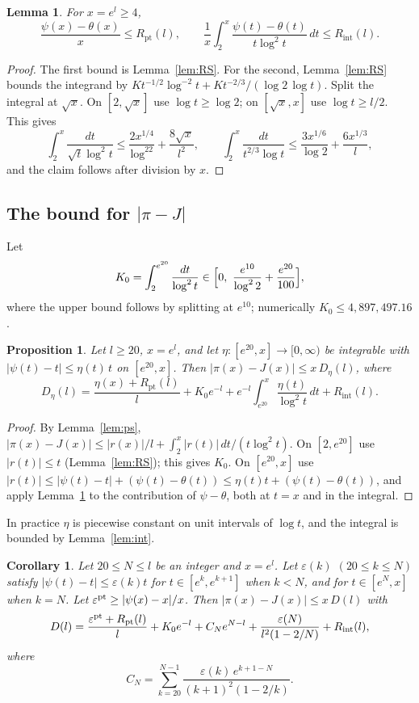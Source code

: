 \documentclass{amsart}
\newtheorem{lemma}[theorem]{Lemma}
\newtheorem{proposition}[theorem]{Proposition}
\newtheorem{corollary}[theorem]{Corollary}
\theoremstyle{definition}
\theoremstyle{remark}
\theoremstyle{plain}
\numberwithin{equation}{section}
\newcommand{\eps}{\varepsilon}
\newcommand{\Rpt}{R_{\mathrm{pt}}}
\newcommand{\Rint}{R_{\mathrm{int}}}
\begin{document}
\begin{lemma}\label{lem:psitheta}
For $x=e^l\ge4$,
\[
\frac{\psi(x)-\theta(x)}{x}\le\Rpt(l),\qquad
\frac1x\int_2^x\frac{\psi(t)-\theta(t)}{t\log^2t}\,dt\le\Rint(l).
\]
\end{lemma}

\begin{proof}
The first bound is Lemma~\ref{lem:RS}. For the second, Lemma~\ref{lem:RS} bounds the integrand by $K t^{-1/2}\log^{-2}t+K t^{-2/3}/(\log2\,\log t)$. Split the integral at $\sqrt x$. On $[2,\sqrt x]$ use $\log t\ge\log2$; on $[\sqrt x,x]$ use $\log t\ge l/2$. This gives
\[
\int_2^x\frac{dt}{\sqrt t\log^2t}\le\frac{2x^{1/4}}{\log^22}+\frac{8\sqrt x}{l^2},\qquad
\int_2^x\frac{dt}{t^{2/3}\log t}\le\frac{3x^{1/6}}{\log2}+\frac{6x^{1/3}}{l},
\]
and the claim follows after division by $x$.
\end{proof}

\subsection{\texorpdfstring{The bound for $|\pi-J|$}{The bound for |pi - J|}}
Let
\[
K_0=\int_2^{e^{20}}\frac{dt}{\log^2t}\in\Bigl[0,\ \frac{e^{10}}{\log^22}+\frac{e^{20}}{100}\Bigr],
\]
where the upper bound follows by splitting at $e^{10}$; numerically $K_0\le4{,}897{,}497.16$.

\begin{proposition}\label{prop:Delta}
Let $l\ge20$, $x=e^l$, and let $\eta:[e^{20},x]\to[0,\infty)$ be integrable with $|\psi(t)-t|\le\eta(t)\,t$ on $[e^{20},x]$. Then $|\pi(x)-J(x)|\le x\,D_\eta(l)$, where
\[
D_\eta(l)=\frac{\eta(x)+\Rpt(l)}{l}+K_0e^{-l}+e^{-l}\int_{e^{20}}^x\frac{\eta(t)}{\log^2t}\,dt+\Rint(l).
\]
\end{proposition}

\begin{proof}
By Lemma~\ref{lem:ps}, $|\pi(x)-J(x)|\le|r(x)|/l+\int_2^x|r(t)|\,dt/(t\log^2t)$. On $[2,e^{20}]$ use $|r(t)|\le t$ (Lemma~\ref{lem:RS}); this gives $K_0$. On $[e^{20},x]$ use $|r(t)|\le|\psi(t)-t|+(\psi(t)-\theta(t))\le\eta(t)t+(\psi(t)-\theta(t))$, and apply Lemma~\ref{lem:psitheta} to the contribution of $\psi-\theta$, both at $t=x$ and in the integral.
\end{proof}

In practice $\eta$ is piecewise constant on unit intervals of $\log t$, and the integral is bounded by Lemma~\ref{lem:int}.

\begin{corollary}\label{cor:segments}
Let $20\le N\le l$ be an integer and $x=e^l$. Let $\eps(k)$ $(20\le k\le N)$ satisfy $|\psi(t)-t|\le\eps(k)t$ for $t\in[e^k,e^{k+1}]$ when $k<N$, and for $t\in[e^N,x]$ when $k=N$. Let $\eps^{\rm pt}\ge|\psi(x)-x|/x$. Then $|\pi(x)-J(x)|\le x\,D(l)$ with
\[
D(l)=\frac{\eps^{\rm pt}+\Rpt(l)}{l}+K_0e^{-l}+C_Ne^{N-l}+\frac{\eps(N)}{l^2(1-2/N)}+\Rint(l),
\]
where
\[
C_N=\sum_{k=20}^{N-1}\frac{\eps(k)\,e^{k+1-N}}{(k+1)^2(1-2/k)}.
\]
\end{corollary}
\end{document}
